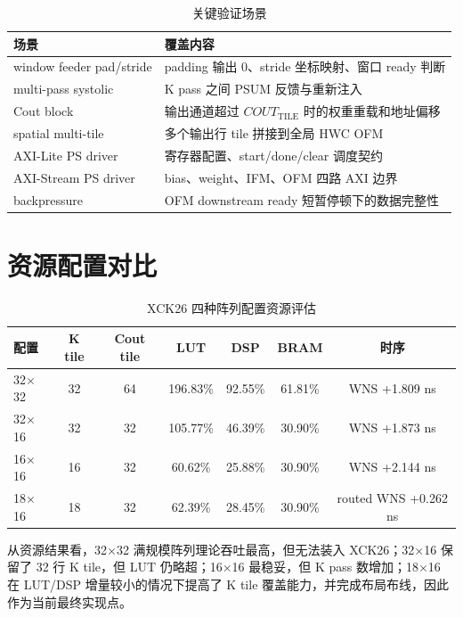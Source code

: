 \documentclass[fontset=fandol,ugly,language=chinese]{pkuthss}
\newcommand{\COUTTILE}{COUT_{\mathrm{TILE}}}
\begin{document}
\begin{table}[htbp]
\centering
\caption{关键验证场景}
\label{tab:verify_report}
\begin{tabular}{lp{}}
\toprule
\textbf{场景} & \textbf{覆盖内容} \\
\midrule
window feeder pad/stride & padding 输出 0、stride 坐标映射、窗口 ready 判断 \\
multi-pass systolic & K pass 之间 PSUM 反馈与重新注入 \\
Cout block & 输出通道超过 $\COUTTILE$ 时的权重重载和地址偏移 \\
spatial multi-tile & 多个输出行 tile 拼接到全局 HWC OFM \\
AXI-Lite PS driver & 寄存器配置、start/done/clear 调度契约 \\
AXI-Stream PS driver & bias、weight、IFM、OFM 四路 AXI 边界 \\
backpressure & OFM downstream ready 短暂停顿下的数据完整性 \\
\bottomrule
\end{tabular}
\end{table}

\section{资源配置对比}

\begin{table}[htbp]
\centering
\caption{XCK26 四种阵列配置资源评估}
\label{tab:resource_report}
\begin{tabular}{lcccccc}
\toprule
\textbf{配置} & \textbf{K tile} & \textbf{Cout tile} & \textbf{LUT} & \textbf{DSP} & \textbf{BRAM} & \textbf{时序} \\
\midrule
32$\times$32 & 32 & 64 & 196.83\% & 92.55\% & 61.81\% & WNS +1.809 ns \\
32$\times$16 & 32 & 32 & 105.77\% & 46.39\% & 30.90\% & WNS +1.873 ns \\
16$\times$16 & 16 & 32 & 60.62\% & 25.88\% & 30.90\% & WNS +2.144 ns \\
18$\times$16 & 18 & 32 & 62.39\% & 28.45\% & 30.90\% & routed WNS +0.262 ns \\
\bottomrule
\end{tabular}
\end{table}

从资源结果看，32$\times$32 满规模阵列理论吞吐最高，但无法装入 XCK26；32$\times$16 保留了 32 行 K tile，但 LUT 仍略超；16$\times$16 最稳妥，但 K pass 数增加；18$\times$16 在 LUT/DSP 增量较小的情况下提高了 K tile 覆盖能力，并完成布局布线，因此作为当前最终实现点。
\end{document}
